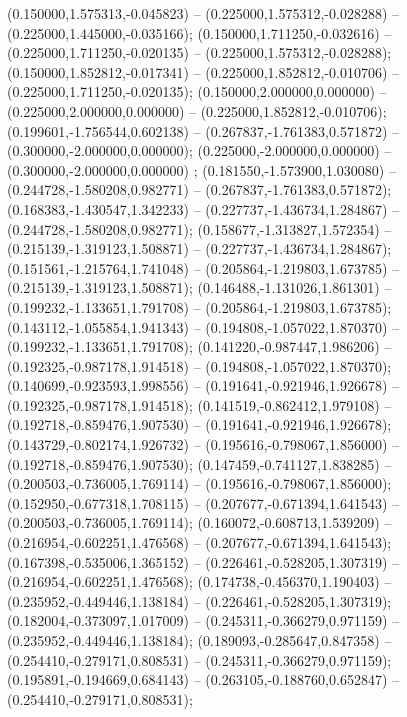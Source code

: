  (0.150000,1.575313,-0.045823) -- (0.225000,1.575312,-0.028288) -- (0.225000,1.445000,-0.035166);
 (0.150000,1.711250,-0.032616) -- (0.225000,1.711250,-0.020135) -- (0.225000,1.575312,-0.028288);
 (0.150000,1.852812,-0.017341) -- (0.225000,1.852812,-0.010706) -- (0.225000,1.711250,-0.020135);
 (0.150000,2.000000,0.000000) -- (0.225000,2.000000,0.000000) -- (0.225000,1.852812,-0.010706);
 (0.199601,-1.756544,0.602138) -- (0.267837,-1.761383,0.571872) -- (0.300000,-2.000000,0.000000);
 (0.225000,-2.000000,0.000000) -- (0.300000,-2.000000,0.000000) ;
 (0.181550,-1.573900,1.030080) -- (0.244728,-1.580208,0.982771) -- (0.267837,-1.761383,0.571872);
 (0.168383,-1.430547,1.342233) -- (0.227737,-1.436734,1.284867) -- (0.244728,-1.580208,0.982771);
 (0.158677,-1.313827,1.572354) -- (0.215139,-1.319123,1.508871) -- (0.227737,-1.436734,1.284867);
 (0.151561,-1.215764,1.741048) -- (0.205864,-1.219803,1.673785) -- (0.215139,-1.319123,1.508871);
 (0.146488,-1.131026,1.861301) -- (0.199232,-1.133651,1.791708) -- (0.205864,-1.219803,1.673785);
 (0.143112,-1.055854,1.941343) -- (0.194808,-1.057022,1.870370) -- (0.199232,-1.133651,1.791708);
 (0.141220,-0.987447,1.986206) -- (0.192325,-0.987178,1.914518) -- (0.194808,-1.057022,1.870370);
 (0.140699,-0.923593,1.998556) -- (0.191641,-0.921946,1.926678) -- (0.192325,-0.987178,1.914518);
 (0.141519,-0.862412,1.979108) -- (0.192718,-0.859476,1.907530) -- (0.191641,-0.921946,1.926678);
 (0.143729,-0.802174,1.926732) -- (0.195616,-0.798067,1.856000) -- (0.192718,-0.859476,1.907530);
 (0.147459,-0.741127,1.838285) -- (0.200503,-0.736005,1.769114) -- (0.195616,-0.798067,1.856000);
 (0.152950,-0.677318,1.708115) -- (0.207677,-0.671394,1.641543) -- (0.200503,-0.736005,1.769114);
 (0.160072,-0.608713,1.539209) -- (0.216954,-0.602251,1.476568) -- (0.207677,-0.671394,1.641543);
 (0.167398,-0.535006,1.365152) -- (0.226461,-0.528205,1.307319) -- (0.216954,-0.602251,1.476568);
 (0.174738,-0.456370,1.190403) -- (0.235952,-0.449446,1.138184) -- (0.226461,-0.528205,1.307319);
 (0.182004,-0.373097,1.017009) -- (0.245311,-0.366279,0.971159) -- (0.235952,-0.449446,1.138184);
 (0.189093,-0.285647,0.847358) -- (0.254410,-0.279171,0.808531) -- (0.245311,-0.366279,0.971159);
 (0.195891,-0.194669,0.684143) -- (0.263105,-0.188760,0.652847) -- (0.254410,-0.279171,0.808531);
